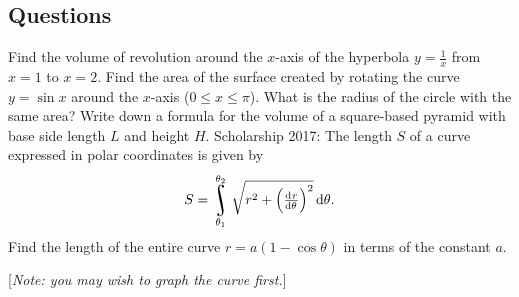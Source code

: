 \subsection*{Questions}
\begin{questions}
  \question Find the volume of revolution around the $ x$-axis of the hyperbola $ y = \frac{1}{x} $ from $ x = 1 $ to $ x = 2 $.
  \question Find the area of the surface created by rotating the curve $ y = \sin x $ around the $ x$-axis ($ 0 \leq x \leq \pi $).
            What is the radius of the circle with the same area?
  \question Write down a formula for the volume of a square-based pyramid with base side length $ L $ and height $ H $.
  \question Scholarship 2017: The length $ S $ of a curve expressed in polar coordinates is given by
            \begin{displaymath}
              S = \rint_{\theta_1}^{\theta_2} \sqrt{r^2 + \left(\od{r}{\theta}\right)^2} \dif{\theta}.
            \end{displaymath}
            Find the length of the entire curve $ r = a (1 - \cos \theta) $ in terms of the constant $ a $.

            [\textit{Note: you may wish to graph the curve first.}]
\end{questions}

